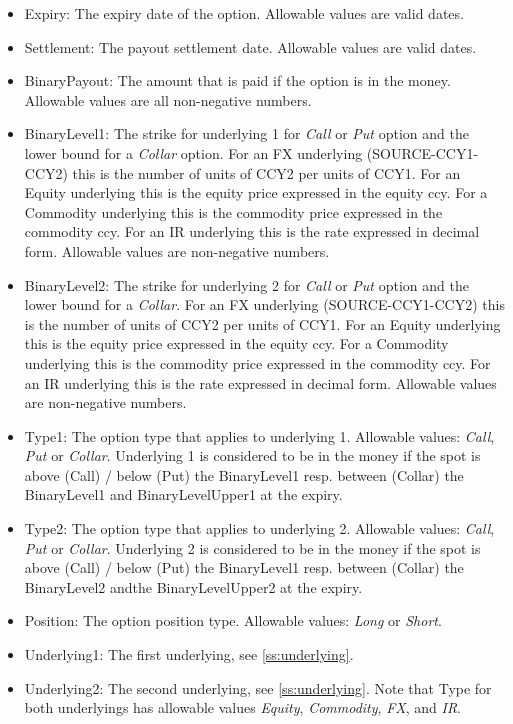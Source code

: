 \begin{itemize}
\item Expiry: The expiry date of the option. Allowable values are valid dates.
\item Settlement: The payout settlement date. Allowable values are valid dates.
\item BinaryPayout: The amount that is paid if the option is in the money. Allowable values are all non-negative numbers.
\item BinaryLevel1: The strike for underlying 1 for {\em Call} or {\em Put} option and the lower bound for a {\em Collar} option. For an FX underlying (SOURCE-CCY1-CCY2) this is the number of units of
  CCY2 per units of CCY1. For an Equity underlying this is the equity price expressed in the equity ccy.  For a Commodity underlying this is the commodity price expressed in the commodity ccy. For an IR underlying this is the rate expressed in decimal form. Allowable values
  are non-negative numbers.
\item BinaryLevel2: The strike for underlying 2 for {\em Call} or {\em Put} option and the lower bound for a {\em Collar}. For an FX underlying (SOURCE-CCY1-CCY2) this is the number of units of
  CCY2 per units of CCY1. For an Equity underlying this is the equity price expressed in the equity ccy.  For a Commodity underlying this is the commodity price expressed in the commodity ccy. For an IR underlying this is the rate expressed in decimal form. Allowable values
  are non-negative numbers.
\item Type1: The option type that applies to underlying 1. Allowable values: {\em Call}, {\em Put} or {\em Collar}. Underlying 1 is
  considered to be in the money if the spot is above (Call) / below (Put) the BinaryLevel1 resp. between (Collar) the BinaryLevel1 and BinaryLevelUpper1 at the expiry. 
\item Type2: The option type that applies to underlying 2. Allowable values: {\em Call}, {\em Put} or {\em Collar}. Underlying 2 is
  considered to be in the money if the spot is above (Call) / below (Put) the BinaryLevel1 resp. between (Collar) the BinaryLevel2 andthe  BinaryLevelUpper2 at the expiry. 
\item Position: The option position type. Allowable values: {\em Long} or {\em Short}.
\item Underlying1: The first underlying, see \ref{ss:underlying}. 
\item Underlying2: The second underlying, see \ref{ss:underlying}. Note that Type for both underlyings has allowable values \emph{Equity}, \emph{Commodity}, \emph{FX}, and \emph{IR}.

\end{itemize}
